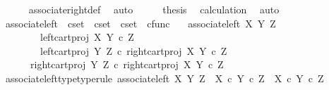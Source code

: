\begin{isabellebody}
\ \ \ \ \isamarkupfalse%
\ associate{\isacharunderscore}{\kern0pt}right{\isacharunderscore}{\kern0pt}def\ \isamarkupfalse%
\ auto\isanewline
\ \ \isamarkupfalse%
\ \isamarkupfalse%
\ {\isacharquery}{\kern0pt}thesis\ \isamarkupfalse%
\ calculation\ \isamarkupfalse%
\ auto\isanewline
{}\isamarkupfalse%
%
\endisatagproof
{\isafoldproof}%
%
\isadelimproof
%
\endisadelimproof
%
\isadelimdocument
%
\endisadelimdocument
%
\isatagdocument
%
\isamarkuptrue%
%
\endisatagdocument
{\isafolddocument}%
%
\isadelimdocument
%
\endisadelimdocument
{}\isamarkupfalse%
\ associate{\isacharunderscore}{\kern0pt}left\ {\isacharcolon}{\kern0pt}{\isacharcolon}{\kern0pt}\ {\isachardoublequoteopen}cset\ {\isasymRightarrow}\ cset\ {\isasymRightarrow}\ cset\ {\isasymRightarrow}\ cfunc{\isachardoublequoteclose}\ \isanewline
\ \ {\isachardoublequoteopen}associate{\isacharunderscore}{\kern0pt}left\ X\ Y\ Z\ {\isacharequal}{\kern0pt}\isanewline
\ \ \ \ {\isasymlangle}\isanewline
\ \ \ \ \ \ {\isasymlangle}\isanewline
\ \ \ \ \ \ \ \ left{\isacharunderscore}{\kern0pt}cart{\isacharunderscore}{\kern0pt}proj\ X\ {\isacharparenleft}{\kern0pt}Y\ {\isasymtimes}\isactrlsub c\ Z{\isacharparenright}{\kern0pt}{\isacharcomma}{\kern0pt}\isanewline
\ \ \ \ \ \ \ \ left{\isacharunderscore}{\kern0pt}cart{\isacharunderscore}{\kern0pt}proj\ Y\ Z\ {\isasymcirc}\isactrlsub c\ right{\isacharunderscore}{\kern0pt}cart{\isacharunderscore}{\kern0pt}proj\ X\ {\isacharparenleft}{\kern0pt}Y\ {\isasymtimes}\isactrlsub c\ Z{\isacharparenright}{\kern0pt}\isanewline
\ \ \ \ \ \ {\isasymrangle}{\isacharcomma}{\kern0pt}\isanewline
\ \ \ \ \ \ right{\isacharunderscore}{\kern0pt}cart{\isacharunderscore}{\kern0pt}proj\ Y\ Z\ {\isasymcirc}\isactrlsub c\ right{\isacharunderscore}{\kern0pt}cart{\isacharunderscore}{\kern0pt}proj\ X\ {\isacharparenleft}{\kern0pt}Y\ {\isasymtimes}\isactrlsub c\ Z{\isacharparenright}{\kern0pt}\isanewline
\ \ \ \ {\isasymrangle}{\isachardoublequoteclose}\isanewline
\isanewline
{}\isamarkupfalse%
\ associate{\isacharunderscore}{\kern0pt}left{\isacharunderscore}{\kern0pt}type{\isacharbrackleft}{\kern0pt}type{\isacharunderscore}{\kern0pt}rule{\isacharbrackright}{\kern0pt}{\isacharcolon}{\kern0pt}\ {\isachardoublequoteopen}associate{\isacharunderscore}{\kern0pt}left\ X\ Y\ Z\ {\isacharcolon}{\kern0pt}\ X\ {\isasymtimes}\isactrlsub c\ {\isacharparenleft}{\kern0pt}Y\ {\isasymtimes}\isactrlsub c\ Z{\isacharparenright}{\kern0pt}\ {\isasymrightarrow}\ {\isacharparenleft}{\kern0pt}X\ {\isasymtimes}\isactrlsub c\ Y{\isacharparenright}{\kern0pt}\ {\isasymtimes}\isactrlsub c\ Z{\isachardoublequoteclose}\isanewline

\end{isabellebody}
